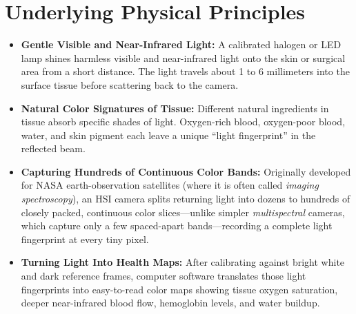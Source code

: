 \section{Underlying Physical Principles}
\begin{itemize}
    \item \textbf{Gentle Visible and Near-Infrared Light:} A calibrated halogen or LED lamp shines harmless visible and near-infrared light onto the skin or surgical area from a short distance. The light travels about 1 to 6 millimeters into the surface tissue before scattering back to the camera.
    \item \textbf{Natural Color Signatures of Tissue:} Different natural ingredients in tissue absorb specific shades of light. Oxygen-rich blood, oxygen-poor blood, water, and skin pigment each leave a unique ``light fingerprint'' in the reflected beam.
    \item \textbf{Capturing Hundreds of Continuous Color Bands:} Originally developed for NASA earth-observation satellites (where it is often called \textit{imaging spectroscopy}), an HSI camera splits returning light into dozens to hundreds of closely packed, continuous color slices---unlike simpler \textit{multispectral} cameras, which capture only a few spaced-apart bands---recording a complete light fingerprint at every tiny pixel.
    \item \textbf{Turning Light Into Health Maps:} After calibrating against bright white and dark reference frames, computer software translates those light fingerprints into easy-to-read color maps showing tissue oxygen saturation, deeper near-infrared blood flow, hemoglobin levels, and water buildup.
\end{itemize}

